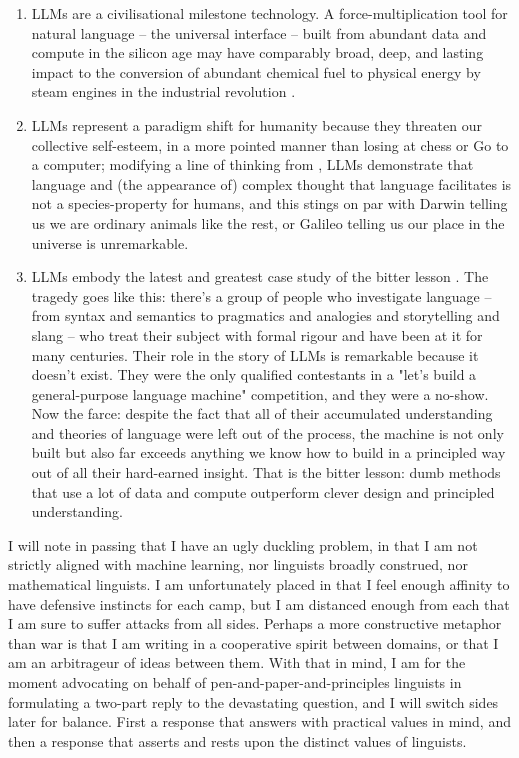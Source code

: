 \begin{fullwidth}
\begin{enumerate}
\item{
LLMs are a civilisational milestone technology. A force-multiplication tool for natural language -- the universal interface \citep{} -- built from abundant data and compute in the silicon age may have comparably broad, deep, and lasting impact to the conversion of abundant chemical fuel to physical energy by steam engines in the industrial revolution \citep{}.
}
\item{
LLMs represent a paradigm shift for humanity because they threaten our collective self-esteem, in a more pointed manner than losing at chess or Go to a computer; modifying a line of thinking from \citep{floridi_fourth_2014}, LLMs demonstrate that language and (the appearance of) complex thought that language facilitates is not a species-property for humans, and this stings on par with Darwin telling us we are ordinary animals like the rest, or Galileo telling us our place in the universe is unremarkable.
}
\item{
LLMs embody the latest and greatest case study of the bitter lesson \citep{sutton_bitter_2019}. The tragedy goes like this: there's a group of people who investigate language -- from syntax and semantics to pragmatics and analogies and storytelling and slang -- who treat their subject with formal rigour and have been at it for many centuries. Their role in the story of LLMs is remarkable because it doesn't exist. They were the only qualified contestants in a "let's build a general-purpose language machine" competition, and they were a no-show. Now the farce: despite the fact that all of their accumulated understanding and theories of language were left out of the process, the machine is not only built but also far exceeds anything we know how to build in a principled way out of all their hard-earned insight. That is the bitter lesson: dumb methods that use a lot of data and compute outperform clever design and principled understanding.
}
\end{enumerate}

I will note in passing that I have an ugly duckling problem, in that I am not strictly aligned with machine learning, nor linguists broadly construed, nor mathematical linguists. I am unfortunately placed in that I feel enough affinity to have defensive instincts for each camp, but I am distanced enough from each that I am sure to suffer attacks from all sides. Perhaps a more constructive metaphor than war is that I am writing in a cooperative spirit between domains, or that I am an arbitrageur of ideas between them. With that in mind, I am for the moment advocating on behalf of pen-and-paper-and-principles linguists in formulating a two-part reply to the devastating question, and I will switch sides later for balance. First a response that answers with practical values in mind, and then a response that asserts and rests upon the distinct values of linguists.


\end{fullwidth}

